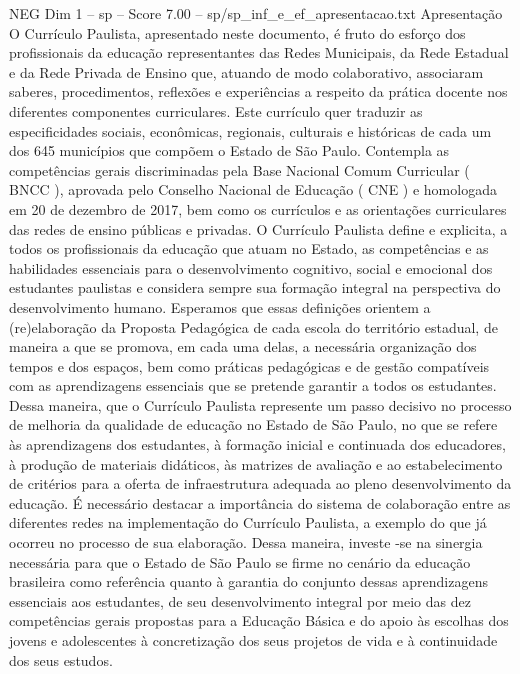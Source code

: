 \begin{textsample}{NEG Dim 1 – sp – Score 7.00 – sp/sp\_inf\_e\_ef\_apresentacao.txt}  \label{ex:f1_neg_174}
Apresentação O Currículo Paulista, apresentado neste documento, é fruto do esforço dos profissionais da educação representantes das Redes Municipais, da Rede Estadual e da Rede Privada de Ensino que, atuando de modo colaborativo, associaram saberes, procedimentos, reflexões e experiências a respeito da prática docente nos diferentes componentes curriculares.
Este currículo quer traduzir as especificidades sociais, econômicas, regionais, culturais e históricas de cada um dos 645 municípios que compõem o Estado de São Paulo.
Contempla as competências gerais discriminadas pela Base Nacional Comum Curricular ( BNCC ), aprovada pelo Conselho Nacional de Educação ( CNE ) e homologada em 20 de dezembro de 2017, bem como os currículos e as orientações curriculares das redes de ensino públicas e privadas.
O Currículo Paulista define e explicita, a todos os profissionais da educação que atuam no Estado, as competências e as habilidades essenciais para o desenvolvimento cognitivo, social e emocional dos estudantes paulistas e considera sempre sua formação integral na perspectiva do desenvolvimento humano.
Esperamos que essas definições orientem a (re)elaboração da Proposta Pedagógica de cada escola do território estadual, de maneira a que se promova, em cada uma delas, a necessária organização dos tempos e dos espaços, bem como práticas pedagógicas e de gestão compatíveis com as aprendizagens essenciais que se pretende garantir a todos os estudantes.
Dessa maneira, que o Currículo Paulista represente um passo decisivo no processo de melhoria da qualidade de educação no Estado de São Paulo, no que se refere às aprendizagens dos estudantes, à formação inicial e continuada dos educadores, à produção de materiais didáticos, às matrizes de avaliação e ao estabelecimento de critérios para a oferta de infraestrutura adequada ao pleno desenvolvimento da educação.
É necessário destacar a importância do sistema de colaboração entre as diferentes redes na implementação do Currículo Paulista, a exemplo do que já ocorreu no processo de sua elaboração.
Dessa maneira, investe -se na sinergia necessária para que o Estado de São Paulo se firme no cenário da educação brasileira como referência quanto à garantia do conjunto dessas aprendizagens essenciais aos estudantes, de seu desenvolvimento integral por meio das dez competências gerais propostas para a Educação Básica e do apoio às escolhas dos jovens e adolescentes à concretização dos seus projetos de vida e à continuidade dos seus estudos.

\end{textsample}
